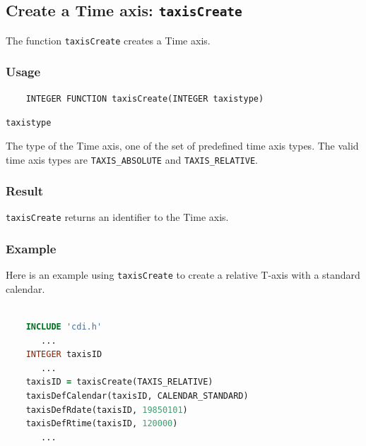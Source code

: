 

\subsection{Create a Time axis: \texttt{taxisCreate}}
\label{taxisCreate}

The function {\texttt{taxisCreate}} creates a Time axis.

\subsubsection*{Usage}

\begin{verbatim}
    INTEGER FUNCTION taxisCreate(INTEGER taxistype)
\end{verbatim}

\hspace*{4mm}\begin{minipage}[]{15cm}
\begin{deflist}{\texttt{taxistype}\ }
\item[\texttt{taxistype}]
The type of the Time axis, one of the set of predefined {\CDI} time axis types.
                      The valid {\CDI} time axis types are {\texttt{TAXIS\_ABSOLUTE}} and {\texttt{TAXIS\_RELATIVE}}.

\end{deflist}
\end{minipage}

\subsubsection*{Result}

{\texttt{taxisCreate}} returns an identifier to the Time axis.


\subsubsection*{Example}

Here is an example using {\texttt{taxisCreate}} to create a relative T-axis with a standard calendar.

\begin{lstlisting}[language=Fortran, backgroundcolor=\color{pyellow}, basicstyle=\small, columns=flexible]

    INCLUDE 'cdi.h'
       ...
    INTEGER taxisID
       ...
    taxisID = taxisCreate(TAXIS_RELATIVE)
    taxisDefCalendar(taxisID, CALENDAR_STANDARD)
    taxisDefRdate(taxisID, 19850101)
    taxisDefRtime(taxisID, 120000)
       ...
\end{lstlisting}


